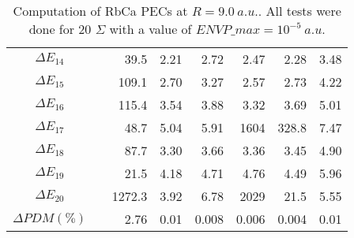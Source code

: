 \documentclass[a4paper,10pt]{article}
\begin{document}
\begin{table*}[htbp]
\begin{center}
\begin{tabular}{|c|r|r|r|r|r|r|r|}
$\Delta E_{14} $  	 	&	&39.5 	& 2.21 	& 2.72 	& 2.47 	& 2.28 	&3.48	 \\
$\Delta E_{15} $  	 	&	&109.1 	& 2.70 	& 3.27 	& 2.57 	& 2.73 	&4.22	\\
$\Delta E_{16} $  	 	&	&115.4 	& 3.54 	& 3.88 	& 3.32 	& 3.69 	&5.01	 \\
$\Delta E_{17} $  	 	&	& 48.7 	& 5.04 	& 5.91 	& 1604 	&328.8 	&7.47	 \\
$\Delta E_{18} $ 	  	&	&87.7 	& 3.30 	& 3.66 	&3.36  	& 3.45 	&4.90	 \\
$\Delta E_{19} $ 	 	&	&21.5 	& 4.18 	& 4.71 	& 4.76 	& 4.49 	&5.96 \\
$\Delta E_{20} $  	 	&	&1272.3	& 3.92 	& 6.78 	& 2029 	& 21.5 	&5.55	 \\
\hline
\hline
$\Delta PDM (\%)$		&	& 2.76 	& 0.01	& 0.008	& 0.006	& 0.004	&0.01 \\
 \hline
 \end{tabular}
 \caption{\label{table9-spin} \small Computation of RbCa PECs at $R=9.0~a.u.$. All tests were done for 20 $\Sigma$ with a value of ${ENVP\_max}=10^{-5}~a.u.$} 
 \end{center}
\end{table*}
\end{document}
